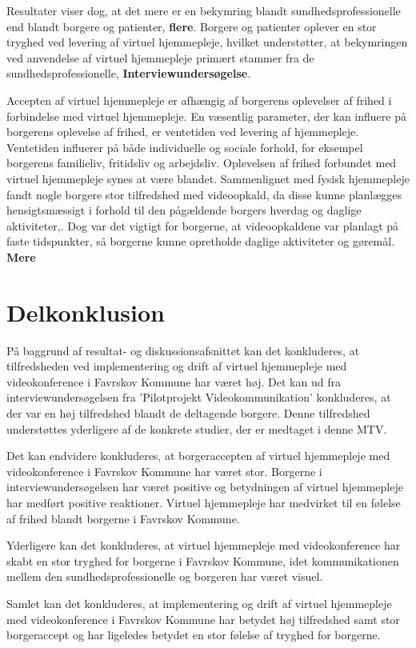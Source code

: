 Resultater viser dog, at det mere er en bekymring blandt sundhedsprofessionelle end blandt borgere og patienter\cite{telenursing}, \textbf{flere}. Borgere og patienter oplever en stor tryghed ved levering af virtuel hjemmepleje, hvilket understøtter, at bekymringen ved anvendelse af virtuel hjemmepleje primært stammer fra de sundhedsprofessionelle\cite{Baf2}, \textbf{Interviewundersøgelse}. 

Accepten af virtuel hjemmepleje er afhængig af borgerens oplevelser af frihed i forbindelse med virtuel hjemmepleje. En væsentlig parameter, der kan influere på borgerens oplevelse af frihed, er ventetiden ved levering af hjemmepleje. Ventetiden influerer på både individuelle og sociale forhold, for eksempel borgerens familieliv, fritidsliv og arbejdsliv. Oplevelsen af frihed forbundet med virtuel hjemmepleje synes at være blandet. Sammenlignet med fysisk hjemmepleje fandt nogle borgere stor tilfredshed med videoopkald, da disse kunne planlægges hensigtsmæssigt i forhold til den pågældende borgers hverdag og daglige aktiviteter\cite{kandidat},\cite{wade}. Dog var det vigtigt for borgerne, at videoopkaldene var planlagt på faste tidspunkter, så borgerne kunne opretholde daglige aktiviteter og gøremål\cite{kandidat}. \textbf{Mere}

\section{Delkonklusion}
På baggrund af resultat- og diskussionsafsnittet kan det konkluderes, at tilfredsheden ved implementering og drift af virtuel hjemmepleje med videokonference i Favrskov Kommune har været høj. Det kan ud fra interviewundersøgelsen fra ’Pilotprojekt Videokommunikation’ konkluderes, at der var en høj tilfredshed blandt de deltagende borgere. Denne tilfredshed understøttes yderligere af de konkrete studier, der er medtaget i denne MTV.

Det kan endvidere konkluderes, at borgeraccepten af virtuel hjemmepleje med videokonference i Favrskov Kommune har været stor. Borgerne i interviewundersøgelsen har været positive og betydningen af virtuel hjemmepleje har medført positive reaktioner. Virtuel hjemmepleje har medvirket til en følelse af frihed blandt borgerne i Favrskov Kommune.

Yderligere kan det konkluderes, at virtuel hjemmepleje med videokonference har skabt en stor tryghed for borgerne i Favrskov Kommune, idet kommunikationen mellem den sundhedsprofessionelle og borgeren har været visuel. 

Samlet kan det konkluderes, at implementering og drift af virtuel hjemmepleje med videokonference i Favrskov Kommune har betydet høj tilfredshed samt stor borgeraccept og har ligeledes betydet en stor følelse af tryghed for borgerne. 












